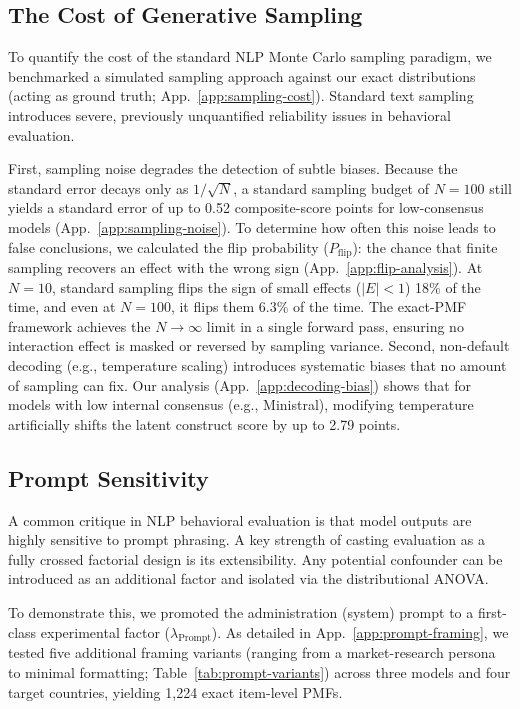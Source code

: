 \subsection{The Cost of Generative Sampling}
\label{sec:sampling-cost}

To quantify the cost of the standard NLP Monte Carlo sampling paradigm, we benchmarked a simulated sampling approach against our exact distributions (acting as ground truth; App.~\ref{app:sampling-cost}). 
Standard text sampling introduces severe, previously unquantified reliability issues in behavioral evaluation. 

First, sampling noise degrades the detection of subtle biases. 
Because the standard error decays only as $1/\sqrt{N}$, a standard sampling budget of $N=100$ still yields a standard error of up to 0.52 composite-score points for low-consensus models (App.~\ref{app:sampling-noise}). 
To determine how often this noise leads to false conclusions, we calculated the flip probability ($P_{\text{flip}}$): the chance that finite sampling recovers an effect with the wrong sign (App.~\ref{app:flip-analysis}). 
At $N=10$, standard sampling flips the sign of small effects ($|E| < 1$) 18\% of the time, and even at $N=100$, it flips them 6.3\% of the time. 
The exact-PMF framework achieves the $N \to \infty$ limit in a single forward pass, ensuring no interaction effect is masked or reversed by sampling variance.
Second, non-default decoding (e.g., temperature scaling) introduces systematic biases that no amount of sampling can fix. 
Our analysis (App.~\ref{app:decoding-bias}) shows that for models with low internal consensus (e.g., Ministral), modifying temperature artificially shifts the latent construct score by up to 2.79 points. 

\subsection{Prompt Sensitivity}
\label{sec:prompt-sensitivity}

A common critique in NLP behavioral evaluation is that model outputs are highly sensitive to prompt phrasing. 
A key strength of casting evaluation as a fully crossed factorial design is its extensibility. 
Any potential confounder can be introduced as an additional factor and isolated via the distributional ANOVA.

To demonstrate this, we promoted the administration (system) prompt to a first-class experimental factor ($\lambda_{\text{Prompt}}$). 
As detailed in App.~\ref{app:prompt-framing}, we tested five additional framing variants (ranging from a market-research persona to minimal formatting; Table~\ref{tab:prompt-variants}) across three models and four target countries, yielding 1,224 exact item-level PMFs.

